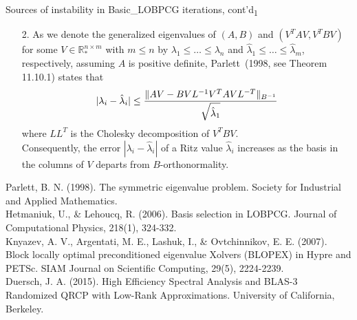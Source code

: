 \documentclass[t,usepdftitle=false]{beamer}
\begin{document}
\begin{frame}{Sources of instability in Basic\_LOBPCG iterations, cont'd\textsubscript{1}}
	\begin{enumerate}
		\item[2.] As we denote the generalized eigenvalues of $(A,B)$ and $(V^TAV,V^TBV)$ for some $V\in\mathbb{R}_*^{n\times m}$ with $m\leq n$ by $\lambda_1\leq\dots\leq\lambda_n$ and $\hat{\lambda}_1\leq\dots\leq\hat{\lambda}_m$, respectively, assuming $A$ is positive definite, Parlett~(1998, see Theorem 11.10.1) states that 
		\begin{align*}
			|\lambda_i-\hat{\lambda}_i|\leq 
			\frac{\|AV-BVL^{-1}V^TAVL^{-T}\|_{B^{-1}}}{\sqrt{\hat{\lambda}_1\vphantom{I^{I^I}}}}
		\end{align*}
		where $LL^T$ is the Cholesky decomposition of $V^TBV$.\\\smallskip
		Consequently, the error $|\lambda_i-\hat{\lambda}_i|$ of a Ritz value $\hat{\lambda}_i$ increases as the basis in the columns of $V$ departs from $B$-orthonormality.	
	\end{enumerate}	
	\medskip
	\tiny{Parlett, B. N. (1998). The symmetric eigenvalue problem. Society for Industrial and Applied Mathematics.}\tinyskip\\
	\tiny{Hetmaniuk, U., \& Lehoucq, R. (2006). Basis selection in LOBPCG. Journal of Computational Physics, 218(1), 324-332.}\tinyskip\\
	\tiny{Knyazev, A. V., Argentati, M. E., Lashuk, I., \& Ovtchinnikov, E. E. (2007). Block locally optimal preconditioned eigenvalue Xolvers (BLOPEX) in Hypre and PETSc. SIAM Journal on Scientific Computing, 29(5), 2224-2239.}\tinyskip\\	
	\tiny{Duersch, J. A. (2015). High Efficiency Spectral Analysis and BLAS-3 Randomized QRCP with Low-Rank Approximations. University of California, Berkeley.}
\end{frame}
\end{document}
